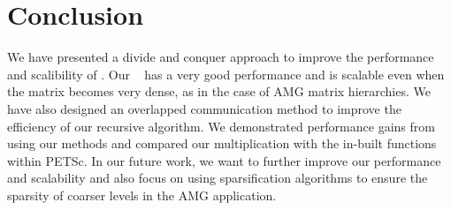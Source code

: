 \section{Conclusion}
\label{sec:conc}

We have presented a divide and conquer approach to improve the performance and scalibility of \mm. Our \mm~ has a very good performance and is scalable even when the matrix becomes very dense, as in the case of AMG matrix hierarchies. We have also designed an overlapped communication method to improve the efficiency of our recursive algorithm. We demonstrated performance gains from using our methods and compared our multiplication with the in-built functions within PETSc. In our future work, we want to further improve our performance and scalability and also focus on using sparsification algorithms to ensure the sparsity of coarser levels in the AMG application. 
